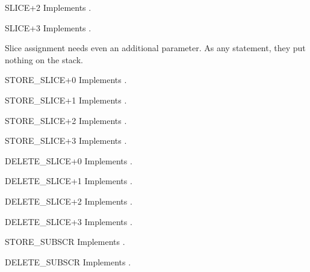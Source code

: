 \begin{opcodedesc}{SLICE+2}{}
Implements .
\end{opcodedesc}

\begin{opcodedesc}{SLICE+3}{}
Implements .
\end{opcodedesc}

Slice assignment needs even an additional parameter.  As any statement,
they put nothing on the stack.

\begin{opcodedesc}{STORE_SLICE+0}{}
Implements .
\end{opcodedesc}

\begin{opcodedesc}{STORE_SLICE+1}{}
Implements .
\end{opcodedesc}

\begin{opcodedesc}{STORE_SLICE+2}{}
Implements .
\end{opcodedesc}

\begin{opcodedesc}{STORE_SLICE+3}{}
Implements .
\end{opcodedesc}

\begin{opcodedesc}{DELETE_SLICE+0}{}
Implements .
\end{opcodedesc}

\begin{opcodedesc}{DELETE_SLICE+1}{}
Implements .
\end{opcodedesc}

\begin{opcodedesc}{DELETE_SLICE+2}{}
Implements .
\end{opcodedesc}

\begin{opcodedesc}{DELETE_SLICE+3}{}
Implements .
\end{opcodedesc}

\begin{opcodedesc}{STORE_SUBSCR}{}
Implements .
\end{opcodedesc}

\begin{opcodedesc}{DELETE_SUBSCR}{}
Implements .
\end{opcodedesc}


